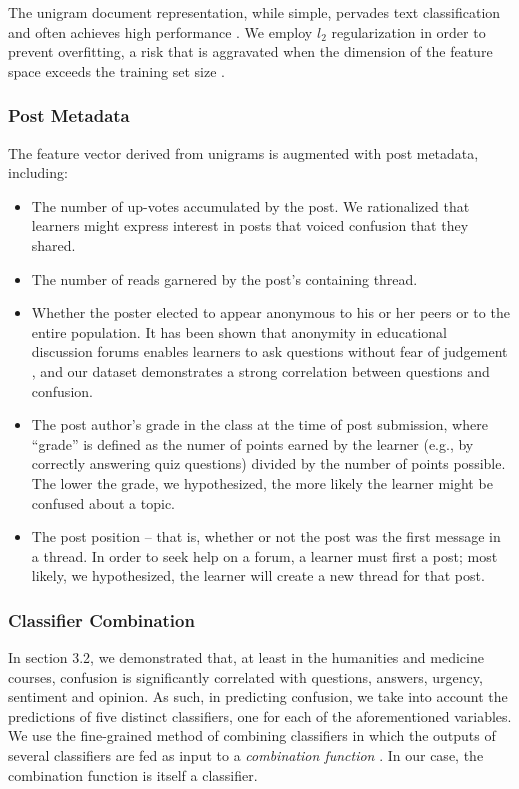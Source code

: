 \documentclass{edm_template}
\begin{document}
The unigram document representation, while simple, pervades text classification and often achieves high performance \cite{boulis2005text}. We employ $l_{2}$ regularization in order to prevent overfitting, a risk that is aggravated when the dimension of the feature space exceeds the training set size \cite{Ng:2004:FSL:1015330.1015435}.

\subsubsection{Post Metadata}
The feature vector derived from unigrams is augmented with post metadata, including: 
\vspace{-15pt}
\begin{itemize}
       \item The number of up-votes accumulated by the post. We rationalized that learners might express interest in posts that voiced confusion that they shared. 
       \item The number of reads garnered by the post's containing thread.
       \item Whether the poster elected to appear anonymous to his or her peers or to the entire population. It has been shown that anonymity in educational discussion forums enables learners to ask questions without fear of judgement \cite{freeman2004student}, and our dataset demonstrates a strong correlation between questions and confusion.
       \item The post author's grade in the class at the time of post submission, where ``grade'' is defined as the numer of points earned by the learner (e.g., by correctly answering quiz questions) divided by the number of points possible. The lower the grade, we hypothesized, the more likely the learner might be confused about a topic.
       \item The post position -- that is, whether or not the post was the first message in a thread. In order to seek help on a forum, a learner must first a post; most likely, we hypothesized, the learner will create a new thread for that post.
\end{itemize}

\subsubsection{Classifier Combination}
In section 3.2, we demonstrated that, at least in the humanities and medicine courses, confusion is significantly correlated with questions, answers, urgency, sentiment and opinion. As such, in predicting confusion, we take into account the predictions of five distinct classifiers, one for each of the aforementioned variables. We use the fine-grained method of combining classifiers in which the outputs of several classifiers are fed as input to a \emph{combination function} \cite{bennett2005combination}. In our case, the combination function is itself a classifier.
\end{document}
